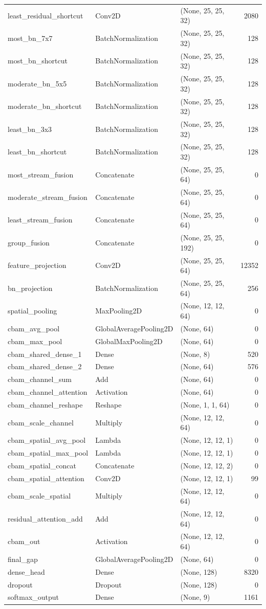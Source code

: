\begin{tabular}{lllr}
least_residual_shortcut & Conv2D & (None, 25, 25, 32) & 2080 \\
most_bn_7x7 & BatchNormalization & (None, 25, 25, 32) & 128 \\
most_bn_shortcut & BatchNormalization & (None, 25, 25, 32) & 128 \\
moderate_bn_5x5 & BatchNormalization & (None, 25, 25, 32) & 128 \\
moderate_bn_shortcut & BatchNormalization & (None, 25, 25, 32) & 128 \\
least_bn_3x3 & BatchNormalization & (None, 25, 25, 32) & 128 \\
least_bn_shortcut & BatchNormalization & (None, 25, 25, 32) & 128 \\
most_stream_fusion & Concatenate & (None, 25, 25, 64) & 0 \\
moderate_stream_fusion & Concatenate & (None, 25, 25, 64) & 0 \\
least_stream_fusion & Concatenate & (None, 25, 25, 64) & 0 \\
group_fusion & Concatenate & (None, 25, 25, 192) & 0 \\
feature_projection & Conv2D & (None, 25, 25, 64) & 12352 \\
bn_projection & BatchNormalization & (None, 25, 25, 64) & 256 \\
spatial_pooling & MaxPooling2D & (None, 12, 12, 64) & 0 \\
cbam_avg_pool & GlobalAveragePooling2D & (None, 64) & 0 \\
cbam_max_pool & GlobalMaxPooling2D & (None, 64) & 0 \\
cbam_shared_dense_1 & Dense & (None, 8) & 520 \\
cbam_shared_dense_2 & Dense & (None, 64) & 576 \\
cbam_channel_sum & Add & (None, 64) & 0 \\
cbam_channel_attention & Activation & (None, 64) & 0 \\
cbam_channel_reshape & Reshape & (None, 1, 1, 64) & 0 \\
cbam_scale_channel & Multiply & (None, 12, 12, 64) & 0 \\
cbam_spatial_avg_pool & Lambda & (None, 12, 12, 1) & 0 \\
cbam_spatial_max_pool & Lambda & (None, 12, 12, 1) & 0 \\
cbam_spatial_concat & Concatenate & (None, 12, 12, 2) & 0 \\
cbam_spatial_attention & Conv2D & (None, 12, 12, 1) & 99 \\
cbam_scale_spatial & Multiply & (None, 12, 12, 64) & 0 \\
residual_attention_add & Add & (None, 12, 12, 64) & 0 \\
cbam_out & Activation & (None, 12, 12, 64) & 0 \\
final_gap & GlobalAveragePooling2D & (None, 64) & 0 \\
dense_head & Dense & (None, 128) & 8320 \\
dropout & Dropout & (None, 128) & 0 \\
softmax_output & Dense & (None, 9) & 1161 \\
\bottomrule
\end{tabular}
